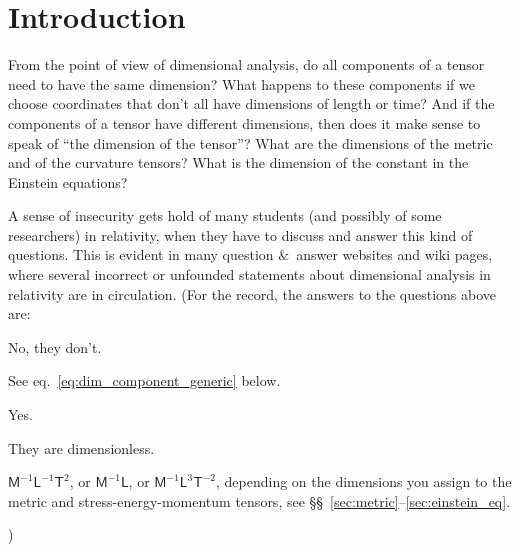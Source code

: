 \documentclass[\ifafour a4paper,12pt,\else a5paper,10pt,\fi%
onecolumn,oneside,article,%
british%
]{memoir}
\theoremstyle{remark}
\theoremstyle{innote}
\newcommand*{\amp}{\&}
\renewcommand*{\|}[1][]{\nonscript\,#1\vert\nonscript\;\mathopen{}}
\newcommand*{\sects}{\S\S}%
\newcommand*{\eqn}{eq.}%
\newcommand*{\Le}{\textsf{L}}
\newcommand*{\Ti}{\textsf{T}}
\newcommand*{\Ma}{\textsf{M}}
\begin{document}

\section{Introduction}
\label{sec:intro}


From the point of view of dimensional analysis, do all components of a
tensor need to have the same dimension? What happens to these components if
we choose coordinates that don't all have dimensions of length or time? And
if the components of a tensor have different dimensions, then does it make
sense to speak of \enquote{the dimension of the tensor}? What are the
dimensions of the metric and of the curvature tensors? What is the
dimension of the constant in the Einstein equations?

A sense of insecurity gets hold of many students (and possibly of some
researchers) in relativity, when they have to discuss and answer this kind
of questions. %
This is evident in many question \amp\ answer websites and wiki pages,
where several incorrect or unfounded statements about dimensional analysis
in relativity are in circulation. (For the record, the answers to the
questions above are:
\begin{enumerate*}[label=\arabic*.]
\item No, they don't. \item See \eqn~\eqref{eq:dim_component_generic}
  below. \item Yes. \item They are dimensionless. \item
  $\Ma^{-1}\Le^{-1}\Ti^{2}$, or $\Ma^{-1}\Le$, or
  $\Ma^{-1}\Le^{3}\Ti^{-2}$, depending on the dimensions you assign to the
  metric and stress-energy-momentum tensors, see
  \sects~\ref{sec:metric}--\ref{sec:einstein_eq}.
\end{enumerate*}
)
\end{document}
